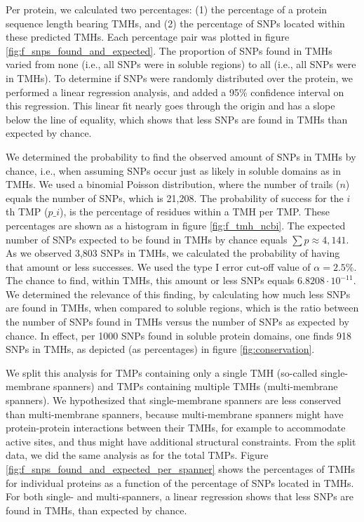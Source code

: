 Per protein, we calculated two percentages: 
(1) the percentage of a protein sequence length bearing TMHs, 
and (2) the percentage of SNPs located within these predicted TMHs.
Each percentage pair was plotted in figure \ref{fig:f_snps_found_and_expected}.
The proportion of SNPs found in TMHs varied from 
none (i.e., all SNPs were in
soluble regions) to all (i.e., all SNPs were in
TMHs).
To determine if SNPs were randomly distributed over the protein, we performed a linear regression analysis,
and added a 95\% confidence interval on this regression.
This linear fit nearly goes through the origin and has a slope
below the line of equality,
which shows that less SNPs are found in TMHs than expected by chance.

We determined the probability to find the observed amount
of SNPs in TMHs by chance, i.e., when assuming SNPs occur 
just as likely in soluble domains as in TMHs.
We used a binomial Poisson distribution, 
where the number of trails ($n$) equals the number of SNPs, 
which is 21,208. 
The probability of success for the $i$th TMP ($p\_i$), 
is the percentage of residues within a TMH per TMP. 
These percentages are shown as a histogram 
in figure \ref{fig:f_tmh_ncbi}. 
The expected number of SNPs expected to be found in 
TMHs by chance equals $\sum{p} \approx 4,141$.
As we observed 3,803 SNPs in TMHs, 
we calculated the probability of having that amount or less successes.
We used the type I error cut-off value of $\alpha = 2.5\%$.
The chance to find, within TMHs, this amount or less SNPs 
equals $6.8208 \cdot 10^{-11}$.
We determined the relevance of this finding, by
calculating how much less SNPs are found in TMHs,
when compared to soluble regions, which is the
ratio between the number of SNPs found in TMHs
versus the number of SNPs as expected by chance.
In effect, per 1000 SNPs found in soluble protein domains, 
one finds 918 SNPs in TMHs,
as depicted (as percentages) in figure \ref{fig:conservation}. 

We split this analysis for TMPs containing only a single TMH (so-called single-membrane spanners) and TMPs containing multiple TMHs (multi-membrane spanners). 
We hypothesized that single-membrane spanners are less conserved than multi-membrane spanners,
because multi-membrane spanners
might have protein-protein interactions between their TMHs, 
for example to accommodate active sites, and 
thus might have additional structural constraints.
From the split data, we did the same analysis as for the total TMPs.
Figure \ref{fig:f_snps_found_and_expected_per_spanner} 
shows the percentages of TMHs for individual proteins as a function of the
percentage of SNPs located in TMHs.
For both single- and multi-spanners, a linear regression shows that less
SNPs are found in TMHs, than expected by chance.

